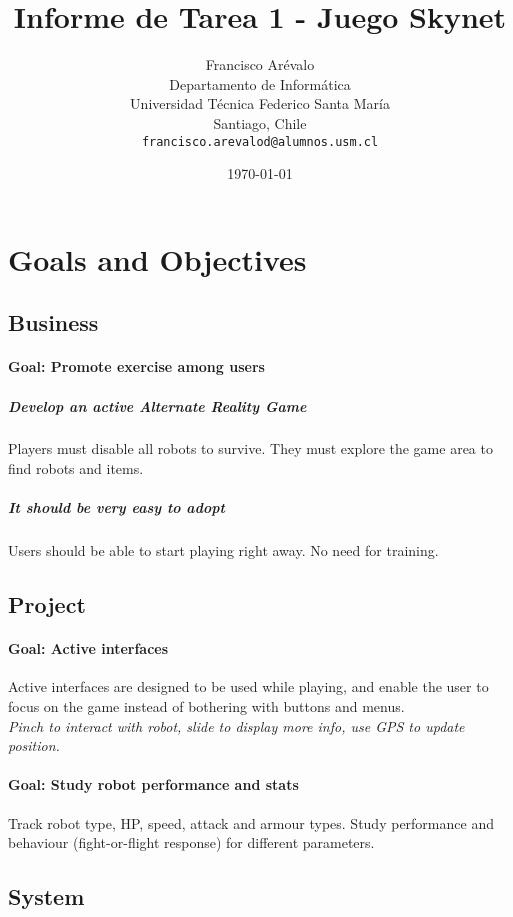 \documentclass{article}
\begin{document}
\title{Informe de Tarea 1 - Juego Skynet}
\author{Francisco Ar\'evalo\\
  Departamento de Inform\'atica\\
  Universidad T\'ecnica Federico Santa Mar\'ia\\
  Santiago, Chile\\
  \texttt{francisco.arevalod@alumnos.usm.cl}}
\date{\today}
\maketitle
\tableofcontents
\section{Goals and Objectives}
\subsection{Business}
\paragraph{\textbf{Goal}: Promote exercise among users}
\subparagraph{Develop an active Alternate Reality Game}
Players must disable all robots to survive. They must explore the game area to find robots and items.
\subparagraph{It should be very easy to adopt}
Users should be able to start playing right away. No need for training.
\subsection{Project}
\paragraph{\textbf{Goal}: Active interfaces}
Active interfaces are designed to be used while playing, and enable the user to focus on the game instead of bothering with buttons and menus.\\
\textit{Pinch to interact with robot, slide to display more info, use GPS to update position.}
\paragraph{\textbf{Goal}: Study robot performance and stats}
Track robot type, HP, speed, attack and armour types. Study performance and behaviour (fight-or-flight response) for different parameters.
\subsection{System}
\end{document}
